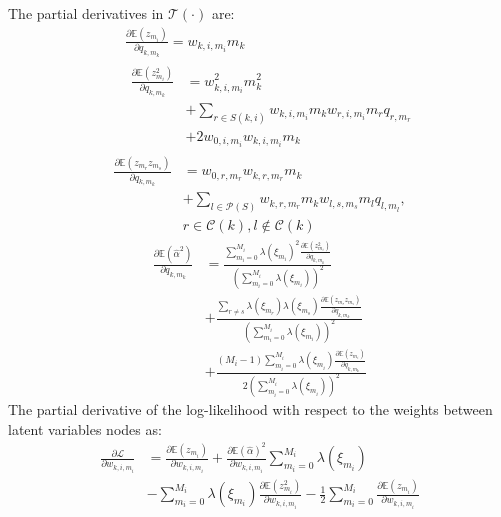 \documentclass[review]{elsarticle}
\begin{document}
The partial derivatives in $\mathcal{T}(\cdot)$ are:
\begin{eqnarray*}
&& \frac{\partial  \mathbb{E}(z_{m_{i}})}{\partial q_{k, m_{k}}}  = w_{k, i, m_{i}}m_{k} \\
&&
 \begin{aligned}
 \frac{\partial \mathbb{E}(z_{m_{i}}^{2})}{\partial q_{k, m_{k}}} & = w_{k, i, m_{i}}^{2}m_{k}^{2} \\
 & + \sum_{r \in S(k,i)}w_{k, i, m_{i}}m_{k}w_{r, i, m_{i}}m_{r}q_{r, m_{r}} \\
& + 2w_{0, i, m_{i}}w_{k, i, m_{i}}m_{k}
\end{aligned}
\end{eqnarray*}
\begin{equation*}
\begin{aligned}
 \frac{\partial \mathbb{E}(z_{m_{r}}z_{m_{s}})}{\partial q_{k, m_{k}}} & = w_{0, r, m_{r}}w_{k, r, m_{r}}m_{k} \\
 & + \sum_{l \in \mathcal{P}(S)}w_{k, r, m_{r}}m_{k}w_{l, s, m_{s}}m_{l}q_{l, m_{l}}, \\
 & r \in \mathcal{C}(k), l \notin \mathcal{C}(k) 
 \end{aligned}
\end{equation*}
\begin{equation*}
\begin{aligned}
 \frac{\partial\mathbb{E}(\hat{\alpha}^{2})}{\partial q_{k, m_{k}}} & = \frac{\sum_{m_{i} = 0}^{M_{i}}\lambda(\xi_{m_{i}})^{2}\frac{\partial \mathbb{E}(z_{m_{i}}^{2})}{\partial q_{k, m_{k}}}}{(\sum_{m_{i} = 0}^{M_{i}}\lambda(\xi_{m_{i}}))^{2}}\\
 &+\frac{\sum_{r \neq s}\lambda(\xi_{m_{r}})\lambda(\xi_{m_{s}})\frac{\partial \mathbb{E}(z_{m_{r}}z_{m_{s}})}{\partial q_{k, m_{k}}}}{(\sum_{m_{i} = 0}^{M_{i}}\lambda(\xi_{m_{i}}))^{2}}\\
  &+\frac{(M_{i} - 1)\sum_{m_{i} = 0}^{M_{i}}\lambda(\xi_{m_{i}})\frac{\partial \mathbb{E}(z_{m_{i}})}{\partial q_{k, m_{k}}}}{2(\sum_{m_{i} = 0}^{M_{i}}\lambda(\xi_{m_{i}}))^{2}}
\end{aligned}
\end{equation*}
The partial derivative of the log-likelihood with respect to the weights between latent variables nodes as: 
\begin{equation*}
\begin{aligned}
\frac{\partial \mathcal{L}}{\partial w_{k, i, m_{i}}} & = \frac{\partial \mathbb{E}(z_{m_{i}})}{\partial w_{k, i, m_{i}}} + \frac{\partial \mathbb{E}(\hat{\alpha})^{2}}{\partial w_{k, i, m_{i}}}\sum_{m_{i}=0}^{M_{i}}\lambda(\xi_{m_{i}}) \\
& - \sum_{m_{i}=0}^{M_{i}}\lambda(\xi_{m_{i}})\frac{\partial \mathbb{E}(z_{m_{i}}^{2})}{\partial w_{k, i, m_{i}}} 
- \frac{1}{2}\sum_{m_{i}=0}^{M_{i}}\frac{\partial \mathbb{E}(z_{m_{i}})}{\partial w_{k, i, m_{i}}} 
 \end{aligned}
\end{equation*}
\end{document}

